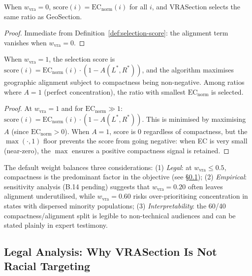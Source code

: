 \begin{proposition}[VRASection reduces to GeoSection at $w_\text{vra} = 0$]
\label{prop:geosection}
When $w_\text{vra} = 0$, $\mathrm{score}(i) = \mathrm{EC}_\text{norm}(i)$
for all $i$, and VRASection selects the same ratio as GeoSection.
\end{proposition}

\begin{proof}
Immediate from Definition~\ref{def:selection-score}: the alignment term
vanishes when $w_\text{vra} = 0$.
\end{proof}

\begin{proposition}[Pure geographic concentration at $w_\text{vra} = 1$]
\label{prop:pure-concentration}
When $w_\text{vra} = 1$, the selection score is
$\mathrm{score}(i) = \mathrm{EC}_\text{norm}(i) \cdot (1 - A(L^*, R^*))$,
and the algorithm maximises geographic alignment subject to compactness
being non-negative.
Among ratios where $A = 1$ (perfect concentration), the ratio with smallest
$\mathrm{EC}_\text{norm}$ is selected.
\end{proposition}

\begin{proof}
At $w_\text{vra} = 1$ and for $\mathrm{EC}_\text{norm} \gg 1$:
$\mathrm{score}(i) = \mathrm{EC}_\text{norm}(i) \cdot (1 - A(L^*, R^*))$.
This is minimised by maximising $A$ (since $\mathrm{EC}_\text{norm} > 0$).
When $A = 1$, score is 0 regardless of compactness, but the $\max(\cdot, 1)$
floor prevents the score from going negative: when EC is very small
(near-zero), the $\max$ ensures a positive compactness signal is retained.
\end{proof}

\begin{remark}[Proposed default $w_\text{vra} = 0.40$]
The default weight balances three considerations:
(1) \emph{Legal}: at $w_\text{vra} \leq 0.5$, compactness is the predominant
factor in the objective (see \S\ref{sec:legal-analysis});
(2) \emph{Empirical}: sensitivity analysis (B.14 pending) suggests that
$w_\text{vra} = 0.20$ often leaves alignment underutilised,
while $w_\text{vra} = 0.60$ risks over-prioritising concentration in states
with dispersed minority populations;
(3) \emph{Interpretability}: the 60/40 compactness/alignment split
is legible to non-technical audiences and can be stated plainly in
expert testimony.
\end{remark}

\subsection{Legal Analysis: Why VRASection Is Not Racial Targeting}
\label{sec:legal-analysis}

